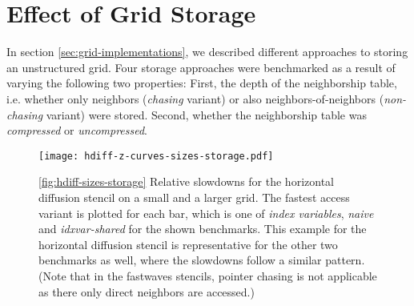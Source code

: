 \section{Effect of Grid Storage} \label{sec:res-storage}

In section \ref{sec:grid-implementations}, we described different approaches to storing an unstructured grid. Four storage approaches were benchmarked as a result of varying the following two properties: First, the depth of the neighborship table, i.e. whether only neighbors (\emph{chasing} variant) or also neighbors-of-neighbors (\emph{non-chasing} variant) were stored. Second, whether the neighborship table was \emph{compressed} or \emph{uncompressed}.

\begin{figure}
	\texttt{[image: hdiff-z-curves-sizes-storage.pdf]}
	\caption{\ref{fig:hdiff-sizes-storage} Relative slowdowns for the horizontal diffusion stencil on a small and a larger grid. The fastest access variant is plotted for each bar, which is one of \emph{index variables}, \emph{naive} and \emph{idxvar-shared} for the shown benchmarks. This example for the horizontal diffusion stencil is representative for the other two benchmarks as well, where the slowdowns follow a similar pattern. (Note that in the fastwaves stencils, pointer chasing is not applicable as there only direct neighbors are accessed.)}
\end{figure}

